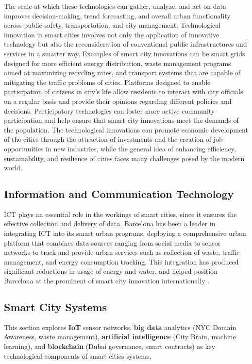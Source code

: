 \documentclass[pdflatex,sn-mathphys-num]{sn-jnl}%
\theoremstyle{thmstyleone}%
\theoremstyle{thmstyletwo}%
\theoremstyle{thmstylethree}%
\begin{document}
The scale at which these technologies can gather, analyze, and act on data improves decision-making, trend forecasting, and overall urban functionality across public safety, transportation, and city management. Technological innovation in smart cities involves not only the application of innovative technology but also the reconsideration of conventional public infrastructures and services in a smarter way. Examples of smart city innovations can be smart grids designed for more efficient energy distribution, waste management programs aimed at maximizing recycling rates, and transport systems that are capable of mitigating the traffic problems of cities. Platforms designed to enable participation of citizens in city's life allow residents to interact with city officials on a regular basis and provide their opinions regarding different policies and decisions. Participatory technologies can foster more active community participation and help ensure that smart city innovations meet the demands of the population. The technological innovations can promote economic development of the cities through the attraction of investments and the creation of job opportunities in new industries, while the general idea of enhancing efficiency, sustainability, and resilience of cities faces many challenges posed by the modern world.

\subsection{Information and Communication Technology}

ICT plays an essential role in the workings of smart cities, since it ensures the effective collection and delivery of data. Barcelona has been a leader in integrating ICT into its smart urban programs, deploying a comprehensive urban platform that combines data sources ranging from social media to sensor networks to track and provide urban services such as collection of waste, traffic management, and energy consumption tracking. This integration has produced significant reductions in usage of energy and water, and helped position Barcelona at the prominent of smart city innovation internationally \cite{r68}.

\subsection{Smart City Systems}
This section explores \textbf{IoT} sensor networks, \textbf{big data} analytics (NYC Domain Awareness, waste management), \textbf{artificial intelligence} (City Brain, machine learning), and \textbf{blockchain} (Dubai governance, smart contracts) as key technological components of smart cities systems.
\end{document}
